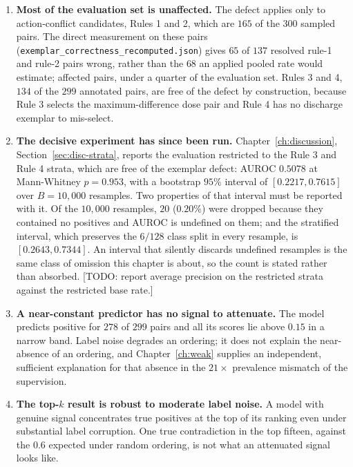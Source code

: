 \begin{enumerate}
\item \textbf{Most of the evaluation set is unaffected.} The defect applies only
      to action-conflict candidates, Rules 1 and 2, which are $165$ of the $300$
      sampled pairs. The direct measurement on these pairs (\texttt{exemplar\_correctness\_recomputed.json}) gives $65$ of $137$ resolved rule-1 and rule-2 pairs wrong, rather than the $68$ an applied pooled rate would estimate;
      affected pairs, under a quarter of the evaluation set. Rules 3 and 4,
      $134$ of the $299$ annotated pairs, are free of the defect by
      construction, because Rule 3
      selects the maximum-difference dose pair and Rule 4 has no discharge
      exemplar to mis-select.
\item \textbf{The decisive experiment has since been run.}
      Chapter~\ref{ch:discussion}, Section~\ref{sec:disc-strata}, reports the
      evaluation restricted to the Rule 3 and Rule 4 strata, which are free of
      the exemplar defect: AUROC $0.5078$ at Mann-Whitney $p = 0.953$, with a
      bootstrap $95\%$ interval of $[0.2217, 0.7615]$ over $B = 10{,}000$
      resamples. Two properties of that interval must be reported with it. Of
      the $10{,}000$ resamples, $20$ ($0.20\%$) were dropped because they
      contained no positives and AUROC is undefined on them; and the stratified
      interval, which preserves the $6/128$ class split in every resample, is
      $[0.2643, 0.7344]$. An interval that silently discards undefined
      resamples is the same class of omission this chapter is about, so the
      count is stated rather than absorbed. [TODO: report average precision on
      the restricted strata against the restricted base rate.]
\item \textbf{A near-constant predictor has no signal to attenuate.} The model
      predicts positive for $278$ of $299$ pairs and all its scores lie above
      $0.15$ in a narrow band. Label noise degrades an ordering; it does not
      explain the near-absence of an ordering, and Chapter~\ref{ch:weak}
      supplies an independent, sufficient explanation for that absence in the
      $21\times$ prevalence mismatch of the supervision.
\item \textbf{The top-$k$ result is robust to moderate label noise.} A model
      with genuine signal concentrates true positives at the top of its ranking
      even under substantial label corruption. One true contradiction in the top
      fifteen, against the $0.6$ expected under random ordering, is not what an
      attenuated signal looks like.
\end{enumerate}

